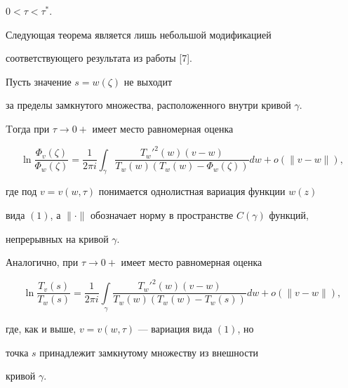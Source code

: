 $0<\tau<\tau^{*}$. 





Следующая теорема является лишь небольшой модификацией


соответствующего результата из работы [7].





\begin{thm}


Пусть значение $s=w(\zeta)$ не выходит


за пределы замкнутого множества, расположенного внутри кривой $\gamma$.


Tогда при $\tau\to 0+$ имеет место равномерная оценка


\begin{equation}


\ln\frac{\Phi_{v}(\zeta)}{\Phi_{w}(\zeta)}=\frac{1}{2\pi i}


\int_{\gamma}


\frac{{T_{w}'}^{2}(w)(v-w)}{T_{w}(w)(T_{w}(w)-\Phi_{w}(\zeta))}dw+o(\|v-w\|),


\end{equation}


где под $v=v(w,\tau)$ понимается однолистная вариация функции $w(z)$


вида $(1)$, а $\|\cdot\|$ обозначает норму в пространстве $C(\gamma)$ функций,


непрерывных на кривой $\gamma$.





Аналогично, при $\tau\to 0+$ имеет место равномерная оценка 


\begin{equation}


\ln\frac{T_{v}(s)}{T_{w}(s)}=


\frac{1}{2\pi i}\int\limits_{\gamma}


\frac{{T_{w}'}^{2}(w)(v-w)}{T_{w}(w)(T_{w}(w)-T_{w}(s))}dw+o(\|v-w\|),


\end{equation}


где, как и выше, $v=v(w,\tau)$ --- вариация вида $(1)$, но


точка $s$ принадлежит замкнутому множеству из внешности 


кривой $\gamma$. 


\end{thm}





